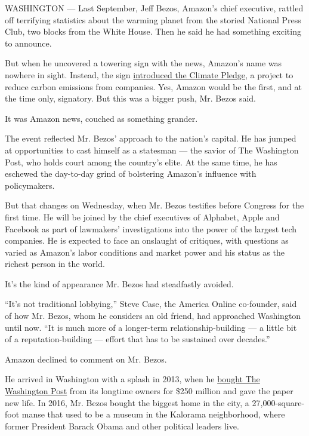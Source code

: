 WASHINGTON --- Last September, Jeff Bezos, Amazon's chief executive,
rattled off terrifying statistics about the warming planet from the
storied National Press Club, two blocks from the White House. Then he
said he had something exciting to announce.

But when he uncovered a towering sign with the news, Amazon's name was
nowhere in sight. Instead, the sign
\href{https://www.nytimes3xbfgragh.onion/2019/09/19/technology/amazon-carbon-neutral.html}{introduced
the Climate Pledge}, a project to reduce carbon emissions from
companies. Yes, Amazon would be the first, and at the time only,
signatory. But this was a bigger push, Mr. Bezos said.

It was Amazon news, couched as something grander.

The event reflected Mr. Bezos' approach to the nation's capital. He has
jumped at opportunities to cast himself as a statesman --- the savior of
The Washington Post, who holds court among the country's elite. At the
same time, he has eschewed the day-to-day grind of bolstering Amazon's
influence with policymakers.

But that changes on Wednesday, when Mr. Bezos testifies before Congress
for the first time. He will be joined by the chief executives of
Alphabet, Apple and Facebook as part of lawmakers' investigations into
the power of the largest tech companies. He is expected to face an
onslaught of critiques, with questions as varied as Amazon's labor
conditions and market power and his status as the richest person in the
world.

It's the kind of appearance Mr. Bezos had steadfastly avoided.

``It's not traditional lobbying,'' Steve Case, the America Online
co-founder, said of how Mr. Bezos, whom he considers an old friend, had
approached Washington until now. ``It is much more of a longer-term
relationship-building --- a little bit of a reputation-building ---
effort that has to be sustained over decades.''

Amazon declined to comment on Mr. Bezos.

He arrived in Washington with a splash in 2013, when he
\href{https://www.nytimes3xbfgragh.onion/2013/08/06/business/media/a-mogul-gets-a-landmark-in-the-capital.html}{bought
The Washington Post} from its longtime owners for \$250 million and gave
the paper new life. In 2016, Mr. Bezos bought the biggest home in the
city, a 27,000-square-foot manse that used to be a museum in the
Kalorama neighborhood, where former President Barack Obama and other
political leaders live.

